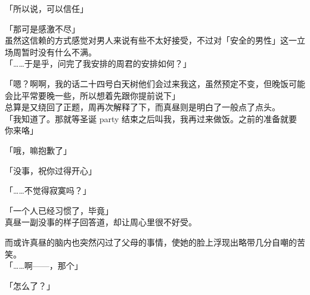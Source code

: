 「所以说，可以信任」

「那可是感激不尽」\\

虽然这信赖的方式感觉对男人来说有些不太好接受，不过对「安全的男性」这一立场周暂时没有什么不满。\\

「……于是乎，问完了我安排的周君的安排如何？」

「嗯？啊啊，我的话二十四号白天树他们会过来我这，虽然预定不变，但晚饭可能会比平常要晚一些，所以想着先跟你提前说下」\\

总算是又绕回了正题，周再次解释了下，而真昼则是明白了一般点了点头。\\

「我知道了。那就等圣诞 party 结束之后叫我，我再过来做饭。之前的准备就要你来咯」

「哦，嘛抱歉了」

「没事，祝你过得开心」

「……不觉得寂寞吗？」

「一个人已经习惯了，毕竟」\\

真昼一副没事的样子回答道，却让周心里很不好受。

而或许真昼的脑内也突然闪过了父母的事情，使她的脸上浮现出略带几分自嘲的苦笑。\\

「……啊——，那个」

「怎么了？」

